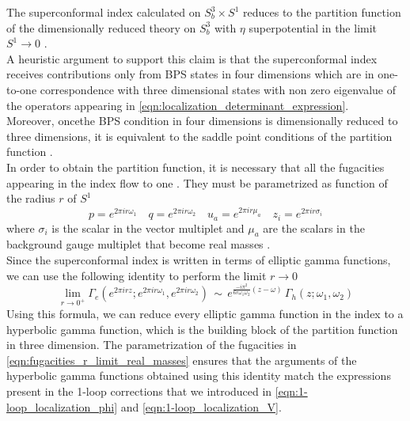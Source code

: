 The superconformal index calculated on $S_b^3 \times S^1$ reduces to the partition function of the dimensionally reduced theory on $S_b^3$ with $\eta$ superpotential in the limit $S^1 \rightarrow 0$  \cite{Gadde:2011ia} \cite{Dolan:2011rp}.\\
A heuristic argument to support this claim is that the superconformal index receives contributions only from BPS states in four dimensions which are in one-to-one correspondence with three dimensional states with non zero eigenvalue of the operators appearing in \eqref{eqn:localization_determinant_expression}.\\
Moreover, oncethe BPS condition in four dimensions is dimensionally reduced to three dimensions, it is equivalent to the saddle point conditions of the partition function \cite{Agarwal:2012hs}.\\
In order to obtain the partition function, it is necessary that all the fugacities appearing in the index flow to one \cite{Dolan:2011rp}.
They must be parametrized as function of the radius $r$ of $S^1$
\begin{equation}
p= e^{2 \pi i r \omega_1} \quad q=e^{2 \pi i r \omega_2} \quad u_a = e^{2 \pi i r \mu_a } \quad z_i = e^{2 \pi i r \sigma_i}
\label{eqn:fugacities_r_limit_real_masses}
\end{equation}
where $\sigma_i$ is the scalar in the vector multiplet and $\mu_a$ are the scalars in the background gauge multiplet that become real masses .
\\
Since the superconformal index is written in terms of elliptic gamma functions, we can use the following identity \cite{vanDeBult:2007} to perform the limit $r \rightarrow 0$ 
\begin{equation}
\lim_{r \rightarrow 0^+} \Gamma_e (e^{ 2 \pi i r z}; e^{ 2 \pi i  r \omega_1} , e^{ 2 \pi i r  \omega_2}) \,  \sim \,
 e^{\frac{ - i \pi^2 }{6  r \omega_1 \omega_2 } ( z - \omega)} 
 \,
 \Gamma_h ( z ; \omega_1 , \omega_2 )
 \label{eqn:elliptic_to_hyperbolic_vdbult}
\end{equation}
Using this formula, we can reduce every elliptic gamma function in the index to a hyperbolic gamma function, which is the building block of the partition function in three dimension.
The parametrization of the fugacities in \eqref{eqn:fugacities_r_limit_real_masses} ensures that the arguments of the hyperbolic gamma functions obtained using this identity match the expressions present in the 1-loop corrections \cite{Dolan:2011rp} that we introduced in \eqref{eqn:1-loop_localization_phi} and \eqref{eqn:1-loop_localization_V}.\\
